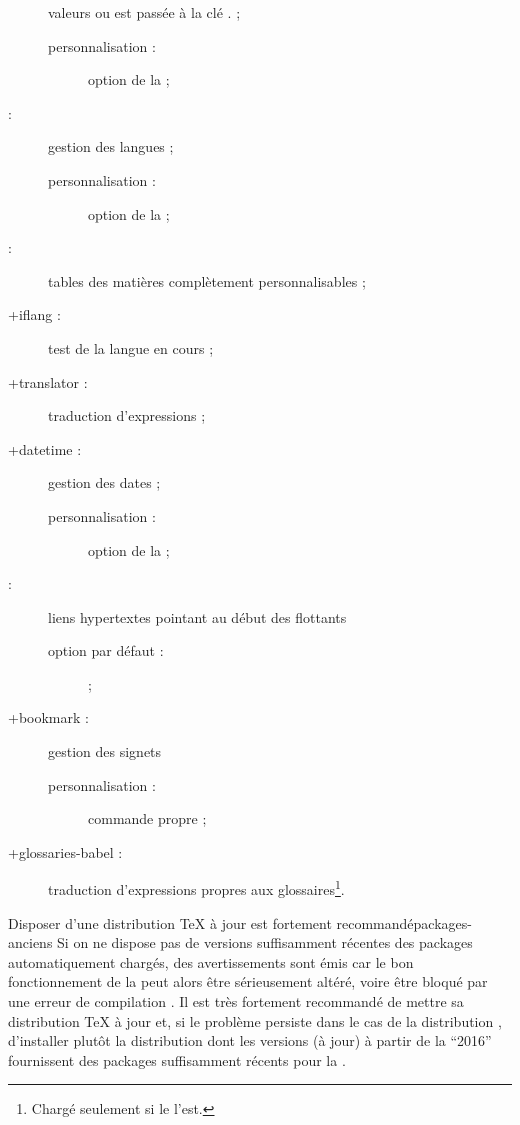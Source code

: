 \begin{description}
{    valeurs  ou  est passée à la clé
    .} ;
  \begin{description}
  \item[personnalisation :] option  de la \yatCl ;
  \end{description}
\item[\package{babel} :] gestion des langues ;
  \begin{description}
  \item[personnalisation :] option  de la \yatCl ;
  \end{description}
\item[\package{etoc} :] tables des matières complètement personnalisables ;
\item[\package*+{iflang} :] test de la langue en cours ;
\item[\package*+{translator} :] traduction d'expressions ;
\item[\package+{datetime} :] gestion des dates ;
  \begin{description}
  \item[personnalisation :] option  de la \yatCl ;
  \end{description}
\item[\package{hypcap} :] liens hypertextes pointant au début des
  flottants%
  \begin{description}
  \item[option par défaut :]  ;
  \end{description}
\item[\package+{bookmark} :] gestion des signets%
  \begin{description}
  \item[personnalisation :] commande propre  ;
  \end{description}
\item[\package*+{glossaries-babel} :] traduction d'expressions propres aux
  glossaires\footnote{Chargé seulement si le  l'est.}.
\end{description}

\begin{dbremark}{Disposer d'une distribution \TeX{} à jour est fortement
    recommandé}{packages-anciens}
  Si on ne dispose pas de versions suffisamment récentes des packages
  automatiquement chargés, des avertissements sont émis car le bon
  fonctionnement de la \yatCl{} peut alors être sérieusement altéré, voire être
  bloqué par une erreur de compilation . Il
  est très fortement recommandé de mettre sa distribution \TeX{} à jour et, si
  le problème persiste dans le cas de la distribution \miktex{},
  d'installer plutôt la distribution \texlive dont les versions (à
  jour) à partir de la \enquote{2016} fournissent des packages suffisamment
  récents pour la \yatCl.
\end{dbremark}

